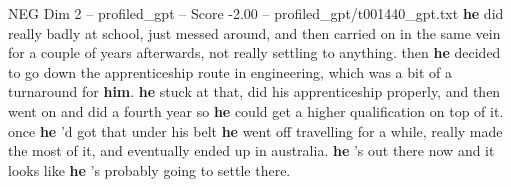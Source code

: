 \begin{textsample}{NEG Dim 2 – profiled\_gpt – Score -2.00 – profiled\_gpt/t001440\_gpt.txt}  \label{ex:f2_neg_039}
\textbf{he} did really badly at school, just messed around, and then carried on in the same vein for a couple of years afterwards, not really settling to anything. then \textbf{he} decided to go down the apprenticeship route in engineering, which was a bit of a turnaround for \textbf{him}. \textbf{he} stuck at that, did his apprenticeship properly, and then went on and did a fourth year so \textbf{he} could get a higher qualification on top of it. once \textbf{he} ’d got that under his belt \textbf{he} went off travelling for a while, really made the most of it, and eventually ended up in australia. \textbf{he} ’s out there now and it looks like \textbf{he} ’s probably going to settle there.

\end{textsample}
